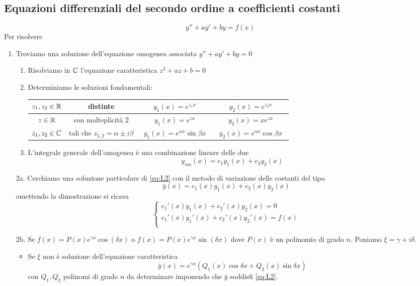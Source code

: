 \documentclass{article}
\begin{document}
\subsection*{Equazioni differenziali del secondo ordine a coefficienti costanti}
\[y''+ay'+by=f(x)\tag{L2}\label{eq:L2}\]
Per risolvere
\begin{enumerate}
    \item Troviamo una soluzione dell'equazione omogenea associata \(y''+ay'+by=0\)
    \begin{enumerate}
        \item Risolviamo in $\mathbb{C}$ l'equazione caratteristica \(z^2+az+b=0\)
        \item Determiniamo le soluzioni fondamentali:
        \begin{center}
            \begin{tabular}[h]{|cc|cc|}
                \hline
                $z_1,z_2\in \mathbb{R}$& distinte &  $y_1(x)=e^{z_1x}$ & $y_2(x)=e^{z_2x}$\\ \hline
                $z\in \mathbb{R}$ &con molteplicità 2 &  $y_1(x)=e^{zx}$ & $y_2(x)=xe^{zx}$\\ \hline
                $z_1,z_2\in \mathbb{C}$ &tali che $z_{1,2}=\alpha \pm i\beta$ &  $~~y_1(x)=e^{\alpha x}\sin \beta x~~$ & $~~y_2(x)=e^{\alpha x}\cos \beta x~~$\\ \hline
            \end{tabular}
        \end{center}
        \item L'integrale generale dell'omogenea è una combinazione lineare delle due
        \[y_{om}(x)=c_1y_1(x)+c_2y_2(x)\]
    \end{enumerate}
    \item[2a.] Cerchiamo una soluzione particolare di \eqref{eq:L2} con il metodo di variazione delle costanti del tipo
    \[\bar{y}(x)=c_1(x)y_1(x)+c_2(x)y_2(x)\]
    omettendo la dimostrazione si ricava 
    \[\begin{cases}
        c_1'(x)y_1(x)+c_2'(x)y_2(x)=0\\
        c_1'(x)y_1'(x)+c_2'(x)y_2'(x)=f(x)\\
    \end{cases}\]
    \item [2b.] Se $f(x)=P(x)e^{\gamma x}\cos(\delta x)$ o $f(x)=P(x)e^{\gamma x}\sin(\delta x)$ dove $P(x)$ è un polinomio di grado $n$. Poniamo $\xi=\gamma+i\delta$.
    \begin{itemize}
        \item Se $\xi$ non è soluzione dell'equazione caratteristica 
        \[\bar y(x)=e^{\gamma x}\left( Q_1(x)\cos \delta x +Q_2(x)\sin \delta x\right)\]
        con $Q_1, Q_2$ polinomi di grado $n$ da determinare imponendo che $\bar y$ soddisfi \eqref{eq:L2}.


\end{itemize}
\end{enumerate}
\end{document}
